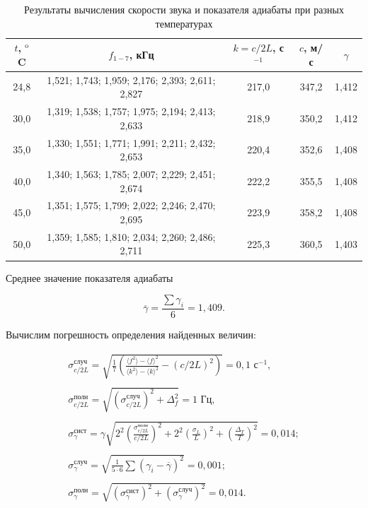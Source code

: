 \documentclass[a4paper,12pt]{article} %
\begin{document}
\begin{table}[]
    \centering
    \begin{tabular}{|c|c|c|c|c|}\hline
        $t$, $^\text{o}$C & $f_{1-7}$, кГц & $k = c/2L$, с$^{-1}$ & $c$, м/с & $\gamma$ \\ \hline
        24,8 & 1,521; 1,743; 1,959; 2,176; 2,393; 2,611; 2,827 & 217,0 & 347,2 & 1,412 \\ \hline
        30,0 & 1,319; 1,538; 1,757; 1,975; 2,194; 2,413; 2,633 & 218,9 & 350,2 & 1,412 \\ \hline 
        35,0 & 1,330; 1,551; 1,771; 1,991; 2,211; 2,432; 2,653 & 220,4 & 352,6 & 1,408 \\ \hline
        40,0 & 1,340; 1,563; 1,785; 2,007; 2,229; 2,451; 2,674 & 222,2 & 355,5 & 1,408 \\ \hline
        45,0 & 1,351; 1,575; 1,799; 2,022; 2,246; 2,470; 2,695 & 223,9 & 358,2 & 1,408 \\ \hline 
        50,0 & 1,359; 1,585; 1,810; 2,034; 2,260; 2,486; 2,711 & 225,3 & 360,5 & 1,403 \\ \hline
    \end{tabular}
    \caption{Результаты вычисления скорости звука и показателя адиабаты при разных температурах}
    \label{tab:exp2}
\end{table}

Среднее значение показателя адиабаты

\begin{equation}
    \overline{\gamma} = \frac{\sum \gamma_i}{6} = 1,409.
\end{equation}

Вычислим погрешность определения найденных величин:

\begin{equation*}
    \begin{array}{c}
        \sigma_{c/2L}^\text{случ} = \sqrt{\frac{1}{7}\left(\frac{\langle f^2 \rangle - \langle f \rangle^2}{\langle k^2 \rangle - \langle k \rangle^2} - (c/2L)^2 \right)} = 0,1 \text{ с}^{-1}, \\ \\
        \sigma_{c/2L}^\text{полн} = \sqrt{(\sigma_{c/2L}^\text{случ})^2 + \Delta_f^2} = 1 \text{ Гц}, \\ \\ 
        \sigma_\gamma^\text{сист} = \gamma \sqrt{2^2(\frac{\sigma_{c/2L}^\text{полн}}{c/2L})^2 + 2^2(\frac{\sigma_L}{L})^2 + (\frac{\Delta_T}{T})^2} = 0,014; \\ \\
        \sigma_\gamma^\text{случ} = \sqrt{\frac{1}{5 \cdot 6}\sum (\gamma_i - \overline{\gamma})^2} = 0,001; \\ \\
        \sigma_\gamma^\text{полн} = \sqrt{(\sigma_\gamma^\text{сист})^2 + (\sigma_\gamma^\text{случ})^2} = 0,014.
    \end{array}
\end{equation*}
\end{document}

